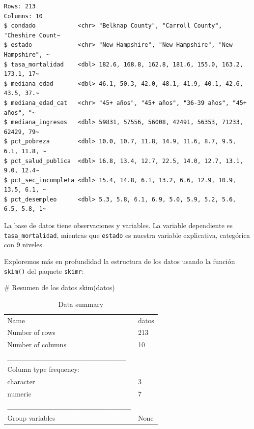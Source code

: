 \documentclass[
  spanish,
  a4paper,
]{scrbook}
\newenvironment{Shaded}{\begin{snugshade}}{\end{snugshade}}
\newcommand{\CommentTok}[1]{\textcolor[rgb]{0.37,0.37,0.37}{#1}}
\newcommand{\FunctionTok}[1]{\textcolor[rgb]{0.28,0.35,0.67}{#1}}
\newcommand{\NormalTok}[1]{\textcolor[rgb]{0.00,0.23,0.31}{#1}}
\begin{document}
\begin{verbatim}
Rows: 213
Columns: 10
$ condado            <chr> "Belknap County", "Carroll County", "Cheshire Count~
$ estado             <chr> "New Hampshire", "New Hampshire", "New Hampshire", ~
$ tasa_mortalidad    <dbl> 182.6, 168.8, 162.8, 181.6, 155.0, 163.2, 173.1, 17~
$ mediana_edad       <dbl> 46.1, 50.3, 42.0, 48.1, 41.9, 40.1, 42.6, 43.5, 37.~
$ mediana_edad_cat   <chr> "45+ años", "45+ años", "36-39 años", "45+ años", "~
$ mediana_ingresos   <dbl> 59831, 57556, 56008, 42491, 56353, 71233, 62429, 79~
$ pct_pobreza        <dbl> 10.0, 10.7, 11.8, 14.9, 11.6, 8.7, 9.5, 6.1, 11.8, ~
$ pct_salud_publica  <dbl> 16.8, 13.4, 12.7, 22.5, 14.0, 12.7, 13.1, 9.0, 12.4~
$ pct_sec_incompleta <dbl> 15.4, 14.8, 6.1, 13.2, 6.6, 12.9, 10.9, 13.5, 6.1, ~
$ pct_desempleo      <dbl> 5.3, 5.8, 6.1, 6.9, 5.0, 5.9, 5.2, 5.6, 6.5, 5.8, 1~
\end{verbatim}

La base de datos tiene observaciones y variables. La variable
dependiente es \texttt{tasa\_mortalidad}, mientras que \texttt{estado}
es nuestra variable explicativa, categórica con 9 niveles.

Exploremos más en profundidad la estructura de los datos usando la
función \texttt{skim()} del paquete \texttt{skimr}:

\begin{Shaded}
\begin{Highlighting}[]
\CommentTok{\# Resumen de los datos}
\FunctionTok{skim}\NormalTok{(datos)}
\end{Highlighting}
\end{Shaded}

\begin{longtable}[]{@{}ll@{}}
\caption{Data summary}\tabularnewline
\toprule\noalign{}
\endfirsthead
\endhead
\bottomrule\noalign{}
\endlastfoot
Name & datos \\
Number of rows & 213 \\
Number of columns & 10 \\
\_\_\_\_\_\_\_\_\_\_\_\_\_\_\_\_\_\_\_\_\_\_\_ & \\
Column type frequency: & \\
character & 3 \\
numeric & 7 \\
\_\_\_\_\_\_\_\_\_\_\_\_\_\_\_\_\_\_\_\_\_\_\_\_ & \\
Group variables & None \\
\end{longtable}
\end{document}
